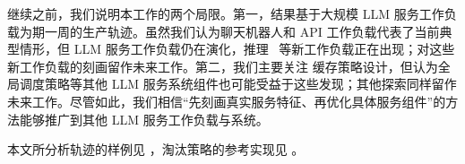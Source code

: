 继续之前，我们说明本工作的两个局限。第一，结果基于大规模 LLM 服务工作负载为期一周的生产轨迹。虽然我们认为聊天机器人和 API 工作负载代表了当前典型情形，但 LLM 服务工作负载仍在演化，推理~\cite{openai-o1} 等新工作负载正在出现；对这些新工作负载的刻画留作未来工作。第二，我们主要关注 {\kvcache} 缓存策略设计，但认为全局调度策略等其他 LLM 服务系统组件也可能受益于这些发现；其他探索同样留作未来工作。尽管如此，我们相信“先刻画真实服务特征、再优化具体服务组件”的方法能够推广到其他 LLM 服务工作负载与系统。

本文所分析轨迹的样例见 ，淘汰策略的参考实现见 。
